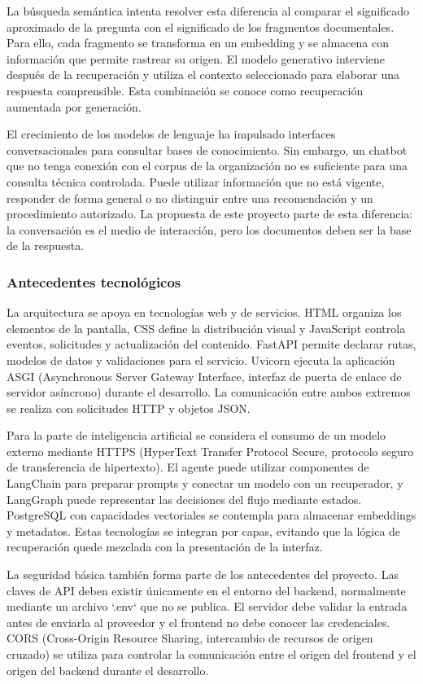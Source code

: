 La búsqueda semántica intenta resolver esta diferencia al comparar el significado aproximado de la pregunta con el significado de los fragmentos documentales. Para ello, cada fragmento se transforma en un embedding y se almacena con información que permite rastrear su origen. El modelo generativo interviene después de la recuperación y utiliza el contexto seleccionado para elaborar una respuesta comprensible. Esta combinación se conoce como recuperación aumentada por generación.

El crecimiento de los modelos de lenguaje ha impulsado interfaces conversacionales para consultar bases de conocimiento. Sin embargo, un chatbot que no tenga conexión con el corpus de la organización no es suficiente para una consulta técnica controlada. Puede utilizar información que no está vigente, responder de forma general o no distinguir entre una recomendación y un procedimiento autorizado. La propuesta de este proyecto parte de esta diferencia: la conversación es el medio de interacción, pero los documentos deben ser la base de la respuesta.

\subsubsection{Antecedentes tecnológicos}

La arquitectura se apoya en tecnologías web y de servicios. HTML organiza los elementos de la pantalla, CSS define la distribución visual y JavaScript controla eventos, solicitudes y actualización del contenido. FastAPI permite declarar rutas, modelos de datos y validaciones para el servicio. Uvicorn ejecuta la aplicación ASGI (Asynchronous Server Gateway Interface, interfaz de puerta de enlace de servidor asíncrono) durante el desarrollo. La comunicación entre ambos extremos se realiza con solicitudes HTTP y objetos JSON.

Para la parte de inteligencia artificial se considera el consumo de un modelo externo mediante HTTPS (HyperText Transfer Protocol Secure, protocolo seguro de transferencia de hipertexto). El agente puede utilizar componentes de LangChain para preparar prompts y conectar un modelo con un recuperador, y LangGraph puede representar las decisiones del flujo mediante estados. PostgreSQL con capacidades vectoriales se contempla para almacenar embeddings y metadatos. Estas tecnologías se integran por capas, evitando que la lógica de recuperación quede mezclada con la presentación de la interfaz.

La seguridad básica también forma parte de los antecedentes del proyecto. Las claves de API deben existir únicamente en el entorno del backend, normalmente mediante un archivo `.env` que no se publica. El servidor debe validar la entrada antes de enviarla al proveedor y el frontend no debe conocer las credenciales. CORS (Cross-Origin Resource Sharing, intercambio de recursos de origen cruzado) se utiliza para controlar la comunicación entre el origen del frontend y el origen del backend durante el desarrollo.

